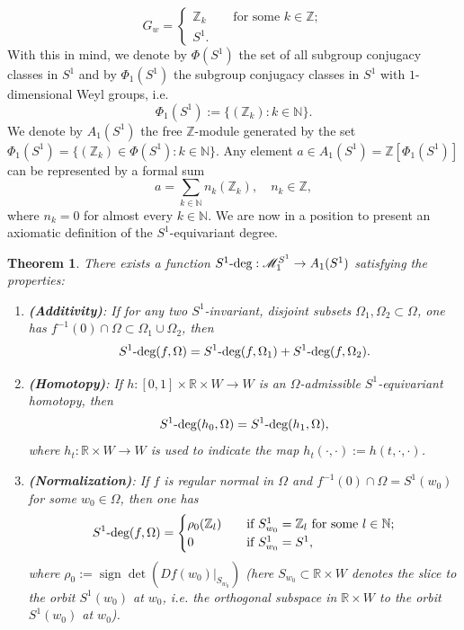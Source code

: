 \documentclass[twoside,11pt]{article}
\def\bn{{\mathbb{N}}}
\def\br{{\mathbb{R}}}
\def\bz{{\mathbb{Z}}}
\def\s1deg{S^1\text{\rm -deg}}
\def\Om{\Omega}
\newtheorem{theorem}{Theorem}[section]
\begin{document}
    \[
    G_w = \begin{cases}
        \bz_k \quad & \text{ for some } k \in \bz; \\
        S^1.
    \end{cases}
    \]
With this in mind, we denote by  $\Phi(S^1)$ the set of all subgroup conjugacy classes in $S^1$ and by $\Phi_1(S^1)$ the subgroup conjugacy classes in $S^1$ with $1$-dimensional Weyl groups, i.e.
\[
\Phi_1(S^1) := \{ (\bz_k) : k \in \bn \}.
\]
We denote by $A_1(S^1)$ the free $\bz$-module generated by the set $\Phi_1(S^1) = \{ (\bz_k) \in \Phi(S^1): k \in \bn \}$. Any element $a \in A_1(S^1) = \bz[\Phi_1(S^1)]$ can be represented by a formal sum
\[
a = \sum_{k \in \bn} n_k(\bz_k), \quad n_k \in \bz,
\]
where $n_k = 0$ for almost every $k \in \bn$. We are now in a position to present an axiomatic definition of the $S^1$-equivariant degree.
\begin{theorem} \rm
    There exists a function $\s1deg: \mathscr M_1^{S^1} \rightarrow A_1(S^1)$ satisfying the properties:
    \begin{enumerate}[label=($S_\arabic*$)]
        \item\label{s1} {\bf (Additivity)}: If for any two $S^1$-invariant, disjoint subsets $\Om_1,\Om_2 \subset \Om$, one has $f^{-1}(0) \cap  \Om \subset \Om_1 \cup \Om_2$, then
        \[
        \s1deg(f,\Om) = \s1deg(f,\Om_1) + \s1deg(f,\Om_2).
        \]
        \item\label{s2} {\bf (Homotopy)}: If $h:[0,1] \times \br \times W \rightarrow W$ is an $\Om$-admissible $S^1$-equivariant homotopy, then
        \[
        \s1deg(h_0,\Om) = \s1deg(h_1,\Om),
        \]
        where $h_t: \br \times W \rightarrow W$ is used to indicate the map $h_t(\cdot, \cdot) := h(t, \cdot,\cdot)$.
        \item\label{s3} {\bf (Normalization)}: If $f$ is regular normal in $\Om$ and $f^{-1}(0) \cap \Om = S^1(w_0)$ for some $w_0 \in \Om$, then one has
    \[
        \s1deg(f,\Om) = \begin{cases}
            \rho_0 (\bz_l) \quad & \text{if } S^1_{w_0} = \bz_l \text{ for some } l \in \bn; \\
             0  \quad & \text{if } S^1_{w_0} = S^1, 
        \end{cases}
        \]
        where $\rho_0 := \operatorname{sign}\det(\left.Df(w_0)\right|_{S_{w_0}})$ (here $S_{w_0} \subset \br \times W$ denotes the slice to the orbit $S^1(w_0)$ at $w_0$, i.e. the orthogonal subspace in $\br \times W$ to the orbit $S^1(w_0)$ at $w_0$).
    \end{enumerate}
\end{theorem}
\end{document}
